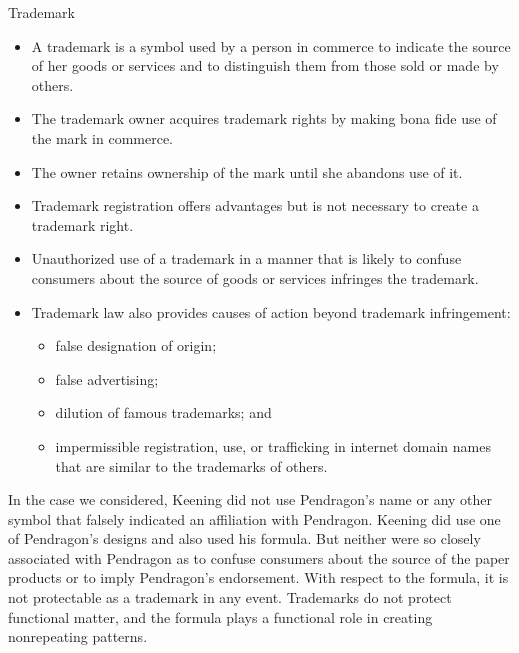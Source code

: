 \documentclass[
  ignorenonframetext,
  aspectratio=169]{beamer}
\providecommand{\tightlist}{%
  \setlength{\itemsep}{0pt}\setlength{\parskip}{0pt}}
\begin{document}
\begin{frame}{Trademark}
\protect\hypertarget{trademark-1}{}
\begin{itemize}
\tightlist
\item
  A trademark is a symbol used by a person in commerce to indicate the
  source of her goods or services and to distinguish them from those
  sold or made by others.
\item
  The trademark owner acquires trademark rights by making bona fide use
  of the mark in commerce.
\item
  The owner retains ownership of the mark until she abandons use of it.
\item
  Trademark registration offers advantages but is not necessary to
  create a trademark right.
\item
  Unauthorized use of a trademark in a manner that is likely to confuse
  consumers about the source of goods or services infringes the
  trademark.
\item
  Trademark law also provides causes of action beyond trademark
  infringement:

  \begin{itemize}
  \tightlist
  \item
    false designation of origin;
  \item
    false advertising;
  \item
    dilution of famous trademarks; and
  \item
    impermissible registration, use, or trafficking in internet domain
    names that are similar to the trademarks of others.
  \end{itemize}
\end{itemize}
\end{frame}

\begin{frame}{}
\protect\hypertarget{section-14}{}
In the case we considered, Keening did not use Pendragon's name or any
other symbol that falsely indicated an affiliation with Pendragon.
Keening did use one of Pendragon's designs and also used his formula.
But neither were so closely associated with Pendragon as to confuse
consumers about the source of the paper products or to imply Pendragon's
endorsement. With respect to the formula, it is not protectable as a
trademark in any event. Trademarks do not protect functional matter, and
the formula plays a functional role in creating nonrepeating patterns.
\end{frame}
\end{document}
